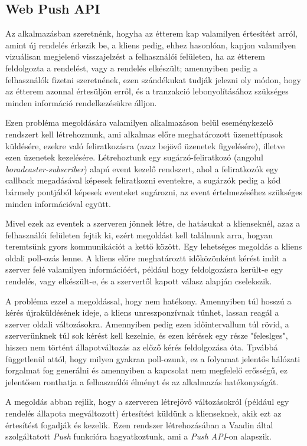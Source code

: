 \subsection{Web Push API}

Az alkalmazásban szeretnénk, hogyha az étterem kap valamilyen értesítést arról, amint új rendelés érkezik be, a kliens pedig, ehhez hasonlóan, kapjon valamilyen vizuálisan megjelenő visszajelzést a felhasználói felületen, ha az étterem feldolgozta a rendelést, vagy a rendelés elkészült; amennyiben pedig a felhasználók fizetni szeretnének, ezen szándékukat tudják jelezni oly módon, hogy az étterem azonnal értesüljön erről, és a tranzakció lebonyolításához szükséges minden információ rendelkezésükre álljon. \par

Ezen probléma megoldására valamilyen alkalmazáson belül eseménykezelő rendszert kell létrehoznunk, ami alkalmas előre meghatározott üzenettípusok küldésére, ezekre való feliratkozásra (azaz bejövő üzenetek figyelésére), illetve ezen üzenetek kezelésére. Létrehoztunk egy sugárzó-feliratkozó (angolul \emph{boradcaster-subscriber}) alapú event kezelő rendszert, ahol a feliratkozók egy callback megadásával képesek feliratkozni eventekre, a sugárzók pedig a kód bármely pontjából képesek eventeket sugározni, az event értelmezéséhez szükséges minden információval együtt. \par

Mivel ezek az eventek a szerveren jönnek létre, de hatásukat a klienseknél, azaz a felhasználói felületen fejtik ki, ezért megoldást kell találnunk arra, hogyan teremtsünk gyors kommunikációt a kettő között. Egy lehetséges megoldás a kliens oldali poll-ozás lenne. A kliens előre meghatároztt időközönként kérést indít a szerver felé valamilyen információért, például hogy feldolgozásra került-e egy rendelés, vagy elkészült-e, és a szervertől kapott válasz alapján cselekszik.

A probléma ezzel a megoldással, hogy nem hatékony. Amennyiben túl hosszú a kérés újraküldésének ideje, a kliens unreszponzívnak tűnhet, lassan reagál a szerver oldali változásokra. Amennyiben pedig ezen időintervallum túl rövid, a szerverünknek túl sok kérést kell kezelnie, és ezen kérések egy része "feleslges", hiszen nem történt állapotváltozás az előző kérés feldolgozása óta. Tpvábbá függetlenül attól, hogy milyen gyakran poll-ozunk, ez a folyamat jelentős hálózati forgalmat fog generálni és amennyiben a kapcsolat nem megfelelő erősségű, ez jelentősen ronthatja a felhasználói élményt és az alkalmazás hatékonyságát. \par

A megoldás abban rejlik, hogy a szerveren létrejövő változásokról (például egy rendelés állapota megváltozott) értesítést küldünk a klienseknek, akik ezt az értesítést fogadják és kezelik. Ezen rendszer létrehozásában a Vaadin által szolgáltatott \emph{Push} funkcióra hagyatkoztunk, ami a \emph{Push API}-on alapszik. \par